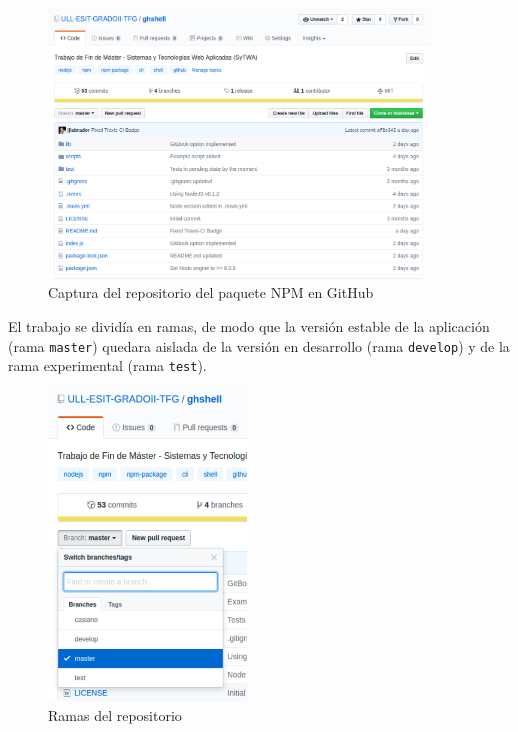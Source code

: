 \begin{figure}[H]
\begin{center}
\includegraphics[width=0.9\textwidth]{images/github1}
\caption{Captura del repositorio del paquete NPM en GitHub}
\label{fig:github1}
\end{center}
\end{figure}
\newpage

El trabajo se dividía en ramas, de modo que la versión estable de la aplicación (rama \verb|master|) quedara aislada de la 
versión en desarrollo (rama \verb|develop|) y de la rama experimental (rama \verb|test|).


\begin{figure}[H]
\begin{center}
\includegraphics[width=0.47\textwidth]{images/github2}
\caption{Ramas del repositorio}
\label{fig:github2}
\end{center}
\end{figure}
\newpage

